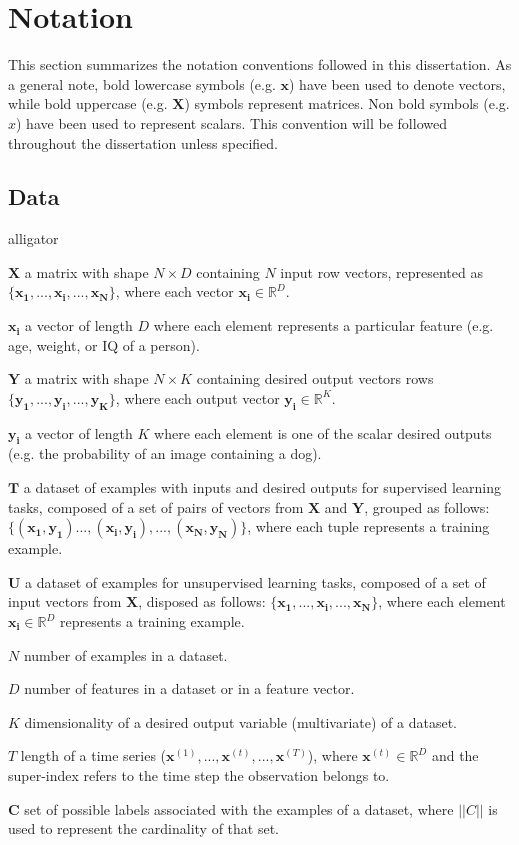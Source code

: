 \chapter*{Notation} \label{ch:notation}
This section summarizes the notation conventions followed in this dissertation. As a general note, bold lowercase symbols (e.g. $\mathbf{x}$) have been used to denote vectors, while bold uppercase (e.g. $\mathbf{X}$) symbols represent matrices. Non bold symbols (e.g. $x$) have been used to represent scalars. This convention will be followed throughout the dissertation unless specified.

\section*{Data }

\begin{labeling}{alligator}
	\item [$\mathbf{X}$] a matrix with shape $N \times D$ containing $N$ input row vectors, represented as $\{\mathbf{x_1},...,\mathbf{x_i},...,\mathbf{x_N}\}$, where each vector $\mathbf{x_i} \in \mathbb{R}^D$.
	\item [$\mathbf{x_i}$] a vector of length $D$ where each element represents a particular feature (e.g. age, weight, or IQ of a person).
	\item [$\mathbf{Y}$] a matrix with shape $N \times K$ containing desired output vectors rows $\{\mathbf{y_1},...,\mathbf{y_i},...,\mathbf{y_K}\}$, where each output vector $\mathbf{y_i} \in \mathbb{R}^K$.
	\item [$\mathbf{y_i}$]  a vector of length $K$ where each element is one of the scalar desired outputs (e.g. the probability of an image containing a dog).
	\item [$\mathbf{T}$] a dataset  of examples with inputs and desired outputs for supervised learning tasks, composed of a set of pairs of vectors from $\mathbf{X}$ and $\mathbf{Y}$, grouped as follows: $\{(\mathbf{x_1}, \mathbf{y_1})...,(\mathbf{x_i}, \mathbf{y_i}),...,(\mathbf{x_N}, \mathbf{y_N})\}$, where each tuple represents a training example.
	\item [$\mathbf{U}$] a dataset of examples for unsupervised learning tasks, composed of a set of input vectors from $\mathbf{X}$, disposed as follows: $\{\mathbf{x_1},...,\mathbf{x_i},...,\mathbf{x_N}\}$, where each element $\mathbf{x_i} \in \mathbb{R}^D$ represents a training example.
	\item [$N$] number of examples in a dataset.
	\item [$D$]  number of features in a dataset or in a feature vector.
	\item [$K$] dimensionality of a desired output variable (multivariate) of a dataset.
	\item [$T$] length of a time series ($\mathbf{x}^{(1)}, ..., \mathbf{x}^{(t)}, ..., \mathbf{x}^{(T)}$), where $\mathbf{x}^{(t)} \in \mathbb{R}^D$ and the super-index refers to the time step the observation belongs to.
	\item [$\mathbf{C}$] set of possible labels associated with the examples of a dataset, where $||C||$ is used to represent the cardinality of that set.
\end{labeling}

